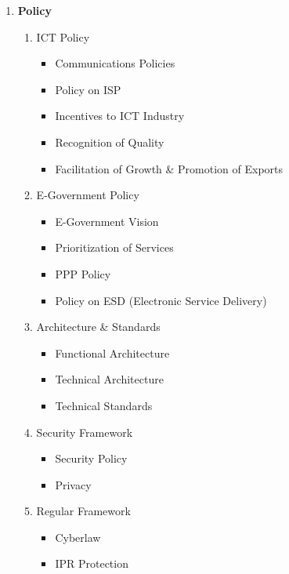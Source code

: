 \begin{enumerate}
	\item \textbf{Policy}
	      \begin{enumerate}
		      \item ICT Policy
		            \begin{itemize}
			            \item Communications Policies
			            \item Policy on ISP
			            \item Incentives to ICT Industry
			            \item Recognition of Quality
			            \item Facilitation of Growth \& Promotion of Exports
		            \end{itemize}

		      \item E-Government Policy
		            \begin{itemize}
			            \item E-Government Vision
			            \item Prioritization of Services
			            \item PPP Policy
			            \item Policy on ESD (Electronic Service Delivery)
		            \end{itemize}

		      \item Architecture \& Standards
		            \begin{itemize}
			            \item Functional Architecture
			            \item Technical Architecture
			            \item Technical Standards
		            \end{itemize}

		      \item Security Framework
		            \begin{itemize}
			            \item Security Policy
			            \item Privacy
		            \end{itemize}

		      \item Regular Framework
		            \begin{itemize}
			            \item Cyberlaw
			            \item IPR Protection
		            \end{itemize}
	      \end{enumerate}


\end{enumerate}
